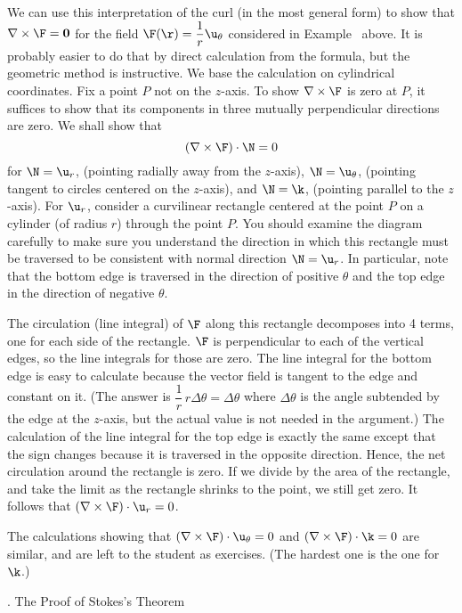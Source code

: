	We can use this interpretation of the curl (in the
most general form) to
show that $\nabla\times\F = \bold 0$  for the
field $\F(\r) = \dfrac 1r \u_\theta$ considered in Example
\en\ above.  It is probably easier to do that by
direct calculation from the formula, but the geometric
method is instructive.  We base the calculation on 
cylindrical coordinates.  Fix a point $P$ not on the $z$-axis.
  To show $\nabla\times\F$ is
zero at $P$, it suffices to show that its components in three
mutually perpendicular directions are zero.  We shall show
that
$$
(\nabla\times\F)\cdot\N = 0
$$
for $\N = \u_r$, (pointing radially away from the $z$-axis),
$\N = \u_\theta$, (pointing tangent to circles centered on the
$z$-axis), and $\N = \k$, (pointing parallel to the $z$-axis).
For $\u_r$, consider a curvilinear rectangle centered
at the point $P$ on a cylinder (of radius $r$)
through the point $P$. You should examine the diagram carefully
to make sure you understand the direction in which this rectangle
must be traversed to be consistent with normal direction
$\N = \u_r$.  In particular, note that the bottom edge is
traversed in the direction of positive $\theta$ and the top
edge in the direction of negative $\theta$.

  The circulation (line integral) of
$\F$ along this rectangle decomposes into 4 terms, one for
each side of the rectangle.  $\F$ is perpendicular to each
of the vertical edges, so the line integrals for those are
zero.   The line integral for the bottom edge is easy to calculate
because the vector field is tangent to the edge and constant
on it.  (The answer is $\dfrac 1r\, r\Delta\theta = \Delta\theta$
where $\Delta\theta$ is the angle subtended by the edge at the
$z$-axis, but the actual value is not needed in the argument.)
 The calculation of the line integral for the top edge is
exactly the same except that the sign changes because it is
traversed in the opposite direction.  Hence, the net circulation
around the rectangle is zero.  If we divide by the area of
the rectangle, and take the limit as the rectangle shrinks to
the point, we still get zero.  It follows that 
$(\nabla\times\F)\cdot\u_r = 0$.     

The calculations showing that
$(\nabla\times\F)\cdot\u_\theta = 0$ and     
$(\nabla\times\F)\cdot\k = 0$ are similar, and are left to the
student as exercises.  (The hardest one is the one for $\k$.)

\bigskip

\bigskip
{}
\head \sn. The Proof of Stokes's Theorem \endhead

